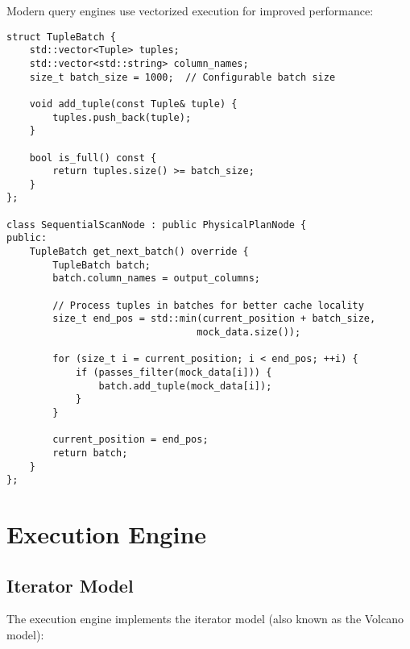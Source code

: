 \documentclass[12pt,a4paper]{article}
\begin{document}
    Modern query engines use vectorized execution for improved performance:

    \begin{minipage}[H]{0.95\textwidth}
        \begin{lstlisting}[style=cpp, caption=Vectorized Batch Processing]
struct TupleBatch {
    std::vector<Tuple> tuples;
    std::vector<std::string> column_names;
    size_t batch_size = 1000;  // Configurable batch size

    void add_tuple(const Tuple& tuple) {
        tuples.push_back(tuple);
    }

    bool is_full() const {
        return tuples.size() >= batch_size;
    }
};

class SequentialScanNode : public PhysicalPlanNode {
public:
    TupleBatch get_next_batch() override {
        TupleBatch batch;
        batch.column_names = output_columns;

        // Process tuples in batches for better cache locality
        size_t end_pos = std::min(current_position + batch_size,
                                 mock_data.size());

        for (size_t i = current_position; i < end_pos; ++i) {
            if (passes_filter(mock_data[i])) {
                batch.add_tuple(mock_data[i]);
            }
        }

        current_position = end_pos;
        return batch;
    }
};
        \end{lstlisting}
    \end{minipage}

    \section{Execution Engine}

    \subsection{Iterator Model}

    The execution engine implements the iterator model (also known as the Volcano model):
\end{document}
